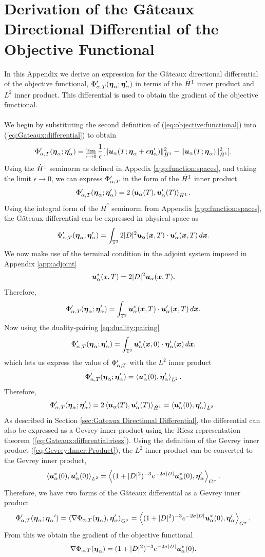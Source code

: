 \chapter{Derivation of the G\^{a}teaux Directional Differential of the Objective Functional}
\label{app:gateaux}

In this Appendix we derive an expression for the G\^{a}teaux directional differential of the objective functional, $\ppat(\bea;\bepa)$ in terms of the $\hdo$ inner product and $L^2$ inner product. This differential is used to obtain the gradient of the objective functional.
\\~\\
We begin by substituting the second definition of (\ref{eq:objective:functional}) into (\ref{eq:Gateaux:differential}) to obtain
$$\ppat(\bea;\bepa)=\lim_{\epsilon\rightarrow 0}\frac{1}{\epsilon}[\|\ua(T;\bea+\epsilon\bepa)\|_{\hdo}^2-\|\ua(T;\bea)\|_{\hdo}^2].$$
Using the $\hdo$ seminorm as defined in Appedix \ref{app:function:spaces}, and taking the limit $\epsilon\rightarrow 0$, we can express $\ppat$ in the form of the $\hdo$ inner product
$$\ppat(\bea;\bepa)=  2\la\ua(T),\upa(T)\ra_{\hdo}.$$
Using the integral form of the $\dot{H}^s$ seminorm from Appendix \ref{app:function:spaces}, the G\^{a}teaux differential can be expressed in physical space as
$$\ppat(\bea;\bepa)= \int_{\TT^3}2|D|^2\ua(\x,T)\cdot\upa(\x,T)\,d\x.$$
We now make use of the terminal condition in the adjoint system imposed in Appendix \ref{app:adjoint}
$$\usa(x,T) = 2|D|^2\ua(\x,T).$$
Therefore,
$$\ppat(\bea;\bepa) = \int_{\TT^3}\usa(\x,T)\cdot\upa(\x,T)\,d\x.$$
Now using the duality-pairing \ref{eq:duality:pairing}
$$\ppat(\bea;\bepa) = \int_{\TT^3}\usa(\x,0)\cdot\bepa(\x)\,d\x,$$
which lets us express the value of $\ppat$ with the $L^2$ inner product
$$\ppat(\bea;\bepa) = \la \usa(0), \bepa\ra_{L^2}.$$
Therefore,
$$\ppat(\bea;\bepa) = 2\la\ua(T),\upa(T)\ra_{\hdo} = \la \usa(0), \bepa\ra_{L^2}.$$
As described in Section \ref{sec:Gateaux Directional Differential}, the differential can also be expressed as a Gevrey inner product using the Riesz representation theorem (\ref{eq:Gateaux:differential:riesz}). Using the definition of the Gevrey inner product (\ref{eq:Gevrey:Inner:Product}), the $L^2$ inner product can be converted to the Gevrey inner product,
$$\la \usa(0),\upa(0)\ra_{L^2} = \la (1+|D|^2)^{-3}e^{-2\sigma|D|} \usa(0),\bepa \ra_{G^\sigma}.$$
Therefore, we have two forms of the G\^{a}teaux differential as a Gevrey inner product
$$\ppat(\bea;\bea') = \la \nabla\pat(\bea),\bepa \ra_{G^\sigma} = \la (1+|D|^2)^{-3}e^{-2\sigma|D|} \usa(0),\bepa \ra_{G^\sigma}.$$
From this we obtain the gradient of the objective functional
$$\nabla \pat(\bea) = (1+|D|^2)^{-3}e^{-2\sigma|D|}\usa(0).$$
